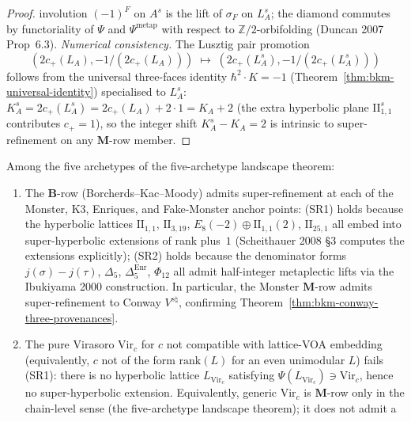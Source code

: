 \begin{proof}[Proof]
involution $(-1)^F$ on $A^{s}$ is the lift of $\sigma_F$ on
$L_A^{s}$; the diamond commutes by functoriality of $\Psi$ and
$\Psi^{\mathrm{metap}}$ with respect to $\mathbb{Z}/2$-orbifolding
(Duncan 2007 Prop~$6.3$).
\emph{Numerical consistency.} The Lusztig pair promotion
\[
 (2 c_+(L_A), -1/(2 c_+(L_A)))
 \;\longmapsto\;
 (2 c_+(L_A^{s}), -1/(2 c_+(L_A^{s})))
\]
follows from the universal three-faces identity
$\hbar^2\cdot K = -1$ (Theorem~\ref{thm:bkm-universal-identity})
specialised to $L_A^{s}$: $K^{s}_A = 2 c_+(L_A^{s}) =
2 c_+(L_A) + 2 \cdot 1 = K_A + 2$ (the extra hyperbolic plane
$\mathrm{II}_{1,1}^{s}$ contributes $c_+ = 1$), so the integer
shift $K^{s}_A - K_A = 2$ is intrinsic to super-refinement on
any $\mathbf{M}$-row member.
\end{proof}

\begin{corollary}
\label{cor:bkm-conway-super-refinement-realisability}
Among the five archetypes of
the five-archetype landscape theorem:
\begin{enumerate}[label=\textup{(\roman*)}]
\item The $\mathbf{B}$-row (Borcherds--Kac--Moody) admits
super-refinement at each of the Monster, K3, Enriques, and
Fake-Monster anchor points: (SR1) holds because the hyperbolic
lattices $\mathrm{II}_{1,1}$, $\mathrm{II}_{3,19}$,
$E_8(-2)\oplus\mathrm{II}_{1,1}(2)$, $\mathrm{II}_{25,1}$ all embed
into super-hyperbolic extensions of rank plus~$1$
(Scheithauer 2008 \S$3$ computes the extensions explicitly); (SR2)
holds because the denominator forms $j(\sigma) - j(\tau)$,
$\Delta_5$, $\Delta_5^{\mathrm{Enr}}$, $\Phi_{12}$ all admit
half-integer metaplectic lifts via the Ibukiyama 2000 construction.
In particular, the Monster $\mathbf{M}$-row admits super-refinement
to Conway $V^{s\natural}$, confirming
Theorem~\ref{thm:bkm-conway-three-provenances}.
\item The pure Virasoro $\mathrm{Vir}_c$ for $c$ not compatible with
lattice-VOA embedding (equivalently, $c$ not of the form
$\mathrm{rank}(L)$ for an even unimodular $L$)
fails (SR1): there is no hyperbolic lattice $L_{\mathrm{Vir}_c}$
satisfying $\Psi(L_{\mathrm{Vir}_c}) \ni \mathrm{Vir}_c$, hence no
super-hyperbolic extension. Equivalently, generic $\mathrm{Vir}_c$ is
$\mathbf{M}$-row only in the chain-level sense
(the five-archetype landscape theorem); it does not admit a

\end{enumerate}
\end{corollary}

